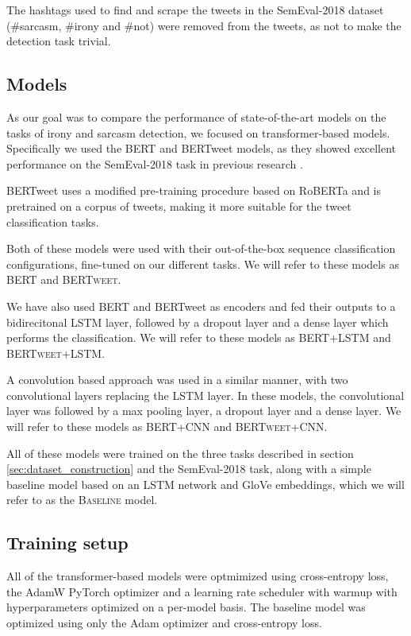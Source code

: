 \documentclass[10pt, a4paper]{article}
\begin{document}
The hashtags used to find and scrape the tweets in the SemEval-2018 dataset (\#sarcasm, \#irony and \#not) were removed
from the tweets, as not to make the detection task trivial.

\subsection{Models}\label{sec:models}

As our goal was to compare the performance of state-of-the-art models on the tasks of irony and sarcasm detection, we 
focused on transformer-based models. Specifically we used the BERT \citep{devlin-etal-2019-bert} and BERTweet \citep{bertweet} models,
as they showed excellent performance on the SemEval-2018 task in previous research \citep{transformers4irony-2020,bertweet}.

BERTweet uses a modified pre-training procedure based on RoBERTa \citep{roberta} and is pretrained on a corpus of tweets, 
making it more suitable for the tweet classification tasks.

Both of these models were used with their out-of-the-box sequence classification configurations, fine-tuned on our 
different tasks. We will refer to these models as \textsc{BERT} and \textsc{BERTweet}.

We have also used BERT and BERTweet as encoders and fed their outputs to a bidirecitonal LSTM layer, followed by 
a dropout layer and a dense layer which performs the classification. We will refer to these models as \textsc{BERT+LSTM}
and \textsc{BERTweet+LSTM}. 

A convolution based approach was used in a similar manner, with two convolutional layers
replacing the LSTM layer. In these models, the convolutional layer was followed by a max pooling layer, a dropout layer
and a dense layer. We will refer to these models as \textsc{BERT+CNN} and \textsc{BERTweet+CNN}.

All of these models were trained on the three tasks described in section \ref{sec:dataset_construction} and the SemEval-2018
task, along with a simple baseline model based on an LSTM network and GloVe embeddings, which we will refer to as the
\textsc{Baseline} model. 

\subsection{Training setup}
All of the transformer-based models were optmimized using cross-entropy loss, the AdamW PyTorch optimizer and a
learning rate scheduler with warmup with hyperparameters optimized on a per-model basis. The baseline model
was optimized using only the Adam optimizer and cross-entropy loss.
\end{document}
